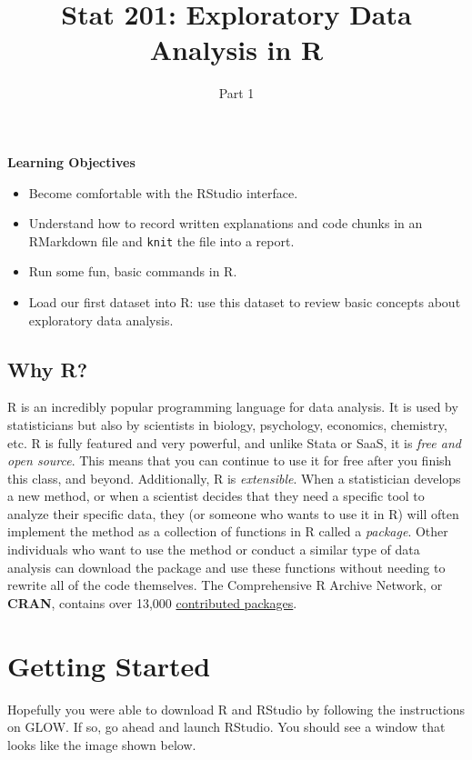 \documentclass[
]{article}
\title{Stat 201: Exploratory Data Analysis in R}
\author{Part 1}
\date{}
\providecommand{\tightlist}{%
  \setlength{\itemsep}{0pt}\setlength{\parskip}{0pt}}
\begin{document}
\maketitle

{
\setcounter{tocdepth}{2}
\tableofcontents
}
\label{boxedtext}
\textbf{Learning Objectives}

\begin{itemize}
\tightlist
\item
  Become comfortable with the RStudio interface.
\item
  Understand how to record written explanations and code chunks in an
  RMarkdown file and \texttt{knit} the file into a report.
\item
  Run some fun, basic commands in R.
\item
  Load our first dataset into R: use this dataset to review basic
  concepts about exploratory data analysis.
\end{itemize}

\subsection{Why R?}\label{why-r}

R is an incredibly popular programming language for data analysis. It is
used by statisticians but also by scientists in biology, psychology,
economics, chemistry, etc. R is fully featured and very powerful, and
unlike Stata or SaaS, it is \emph{free and open source}. This means that
you can continue to use it for free after you finish this class, and
beyond. Additionally, R is \emph{extensible}. When a statistician
develops a new method, or when a scientist decides that they need a
specific tool to analyze their specific data, they (or someone who wants
to use it in R) will often implement the method as a collection of
functions in R called a \emph{package}. Other individuals who want to
use the method or conduct a similar type of data analysis can download
the package and use these functions without needing to rewrite all of
the code themselves. The Comprehensive R Archive Network, or
\textbf{CRAN}, contains over 13,000
\href{https://cran.r-project.org/web/packages/}{contributed packages}.

\section{Getting Started}\label{getting-started}

Hopefully you were able to download R and RStudio by following the
instructions on GLOW. If so, go ahead and launch RStudio. You should see
a window that looks like the image shown below.
\end{document}
